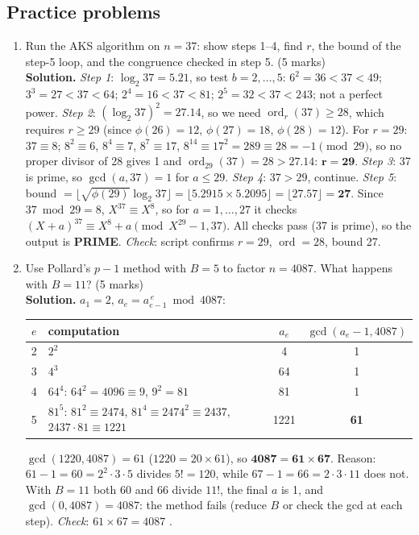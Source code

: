 \subsection*{Practice problems}
\begin{enumerate}[leftmargin=1.6em,itemsep=4pt]
  \item Run the AKS algorithm on $n = 37$: show steps 1--4, find $r$, the bound of the step-5 loop, and the congruence checked in step 5. \hfill(5 marks)\\
  \textbf{Solution.} \emph{Step 1}: $\log_2 37 = 5.21$, so test $b = 2, \dots, 5$: $6^2 = 36 < 37 < 49$; $3^3 = 27 < 37 < 64$; $2^4 = 16 < 37 < 81$; $2^5 = 32 < 37 < 243$; not a perfect power.
  \emph{Step 2}: $(\log_2 37)^2 = 27.14$, so we need $\operatorname{ord}_r(37) \ge 28$, which requires $r \ge 29$ (since $\phi(26) = 12$, $\phi(27) = 18$, $\phi(28) = 12$). For $r = 29$: $37 \equiv 8$; $8^2 \equiv 6$, $8^4 \equiv 7$, $8^7 \equiv 17$, $8^{14} \equiv 17^2 = 289 \equiv 28 = -1 \pmod{29}$, so no proper divisor of 28 gives 1 and $\operatorname{ord}_{29}(37) = 28 > 27.14$: $\mathbf{r = 29}$.
  \emph{Step 3}: 37 is prime, so $\gcd(a, 37) = 1$ for $a \le 29$. \emph{Step 4}: $37 > 29$, continue.
  \emph{Step 5}: bound $= \lfloor\sqrt{\phi(29)}\log_2 37\rfloor = \lfloor 5.2915 \times 5.2095\rfloor = \lfloor 27.57\rfloor = \mathbf{27}$. Since $37 \bmod 29 = 8$, $X^{37} \equiv X^8$, so for $a = 1, \dots, 27$ it checks $(X + a)^{37} \equiv X^8 + a \pmod{X^{29} - 1, 37}$. All checks pass (37 is prime), so the output is \textbf{PRIME}.
  \emph{Check}: script confirms $r = 29$, $\operatorname{ord} = 28$, bound 27.

  \item Use Pollard's $p - 1$ method with $B = 5$ to factor $n = 4087$. What happens with $B = 11$? \hfill(5 marks)\\
  \textbf{Solution.} $a_1 = 2$, $a_e = a_{e-1}^{\,e} \bmod 4087$:
  \begin{center}\small
  \begin{tabular}{@{}clcc@{}}
  \toprule
  $e$ & computation & $a_e$ & $\gcd(a_e - 1, 4087)$\\
  \midrule
  2 & $2^2$ & 4 & 1\\
  3 & $4^3$ & 64 & 1\\
  4 & $64^4$: $64^2 = 4096 \equiv 9$, $9^2 = 81$ & 81 & 1\\
  5 & $81^5$: $81^2 \equiv 2474$, $81^4 \equiv 2474^2 \equiv 2437$, $2437 \cdot 81 \equiv 1221$ & 1221 & \textbf{61}\\
  \bottomrule
  \end{tabular}
  \end{center}
  $\gcd(1220, 4087) = 61$ ($1220 = 20 \times 61$), so $\mathbf{4087 = 61 \times 67}$. Reason: $61 - 1 = 60 = 2^2 \cdot 3 \cdot 5$ divides $5! = 120$, while $67 - 1 = 66 = 2 \cdot 3 \cdot 11$ does not. With $B = 11$ both 60 and 66 divide $11!$, the final $a$ is 1, and $\gcd(0, 4087) = 4087$: the method fails (reduce $B$ or check the gcd at each step). \emph{Check}: $61 \times 67 = 4087$ \checkmark.


\end{enumerate}
